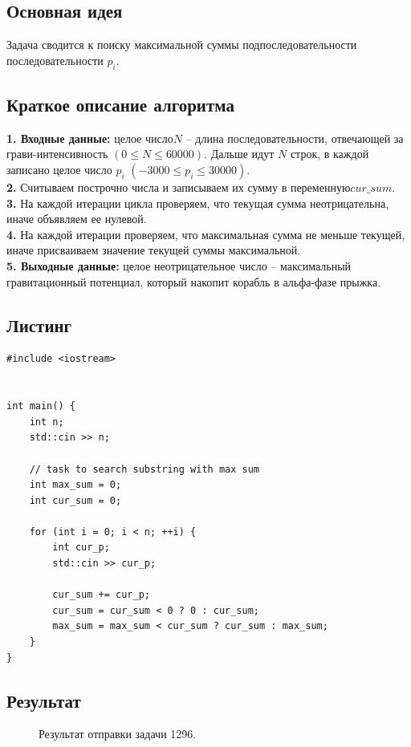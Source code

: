 \documentclass[a5paper, 10pt]{article}
\theoremstyle{definition}
\theoremstyle{plain}
\theoremstyle{remark}
\begin{document}
\subsection{Основная идея}
Задача сводится к поиску максимальной суммы подпоследовательности последовательности $p_i$.

\subsection{Краткое описание алгоритма}
\textbf{1. Входные данные:} целое число$N$ -- длина последовательности, отвечающей за грави-интенсивность $(0 \leq N \leq 60000)$. Дальше идут $N$ строк, в каждой записано целое число $p_i$ $ (-3000 \leq p_i \leq 30000)$.\\
\textbf{2.} Считываем построчно числа и записываем их сумму в переменную$cur\_sum$.\\
\textbf{3.} На каждой итерации цикла проверяем, что текущая сумма неотрицательна, иначе объявляем ее нулевой.\\
\textbf{4.} На каждой итерации проверяем, что максимальная сумма не меньше текущей, иначе присваиваем значение текущей суммы максимальной.\\
\textbf{5. Выходные данные:} целое неотрицательное число -- максимальный гравитационный потенциал, который накопит корабль в альфа-фазе прыжка.


\subsection{Листинг}

\begin{center}
\begin{lstlisting}[label=some-code,caption={Исходный код для 1296}]
#include <iostream>


int main() {
    int n;
    std::cin >> n;

    // task to search substring with max sum
    int max_sum = 0;
    int cur_sum = 0;

    for (int i = 0; i < n; ++i) {
        int cur_p;
        std::cin >> cur_p;

        cur_sum += cur_p;
        cur_sum = cur_sum < 0 ? 0 : cur_sum;
        max_sum = max_sum < cur_sum ? cur_sum : max_sum;
    }
}

\end{lstlisting}
\end{center}

\subsection{Результат}
\begin{figure}[h]
\caption{Результат отправки задачи 1296.}
\end{figure}
\end{document}
